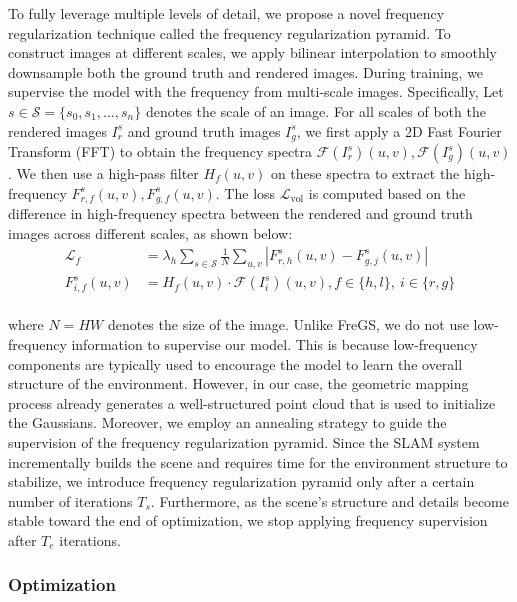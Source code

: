 To fully leverage multiple levels of detail, we propose a novel frequency regularization technique called the frequency regularization pyramid. To construct images at different scales, we apply bilinear interpolation to smoothly downsample both the ground truth and rendered images. During training, we supervise the model with the frequency from multi-scale images. Specifically, Let $s \in \mathcal{S} = \{s_0, s_1, \ldots, s_n\}$ denotes the scale of an image. For all scales of both the rendered images $I_r^{s}$ and ground truth images $I_g^{s}$, we first apply a 2D Fast Fourier Transform (FFT) to obtain the frequency spectra $\mathcal{F}(I_r^{s})(u, v), \mathcal{F}(I_g^{s})(u, v)$. We then use a high-pass filter $H_f(u, v)$ on these spectra to extract the high-frequency $F_{r, f}^{s}(u, v), F_{g, f}^{s}(u, v)$. The loss $\mathcal{L}_{\text{vol}}$ is computed based on the difference in high-frequency spectra between the rendered and ground truth images across different scales, as shown below:
\begin{align}
\mathcal{L}_{f} &=\lambda_h \sum_{s \in \mathcal{S}} \frac{1}{N} \sum_{u, v} \left| F_{r, h}^{s}(u, v) - F_{g, j}^{s}(u, v) \right|  \\
F_{i, f}^{s}(u, v) &= H_f(u, v) \cdot \mathcal{F}(I_i^{s})(u, v), f\in \{h, l\},\ i\in \{r, g\} \nonumber
\end{align} \\
where $N =HW$ denotes the size of the image. Unlike FreGS, we do not use low-frequency information to supervise our model. This is because low-frequency components are typically used to encourage the model to learn the overall structure of the environment. However, in our case, the geometric mapping process already generates a well-structured point cloud that is used to initialize the Gaussians. Moreover, we employ an annealing strategy to guide the supervision of the frequency regularization pyramid. Since the SLAM system incrementally builds the scene and requires time for the environment structure to stabilize, we introduce frequency regularization pyramid only after a certain number of iterations $T_s$. Furthermore, as the scene's structure and details become stable toward the end of optimization, we stop applying frequency supervision after $T_e$ iterations.

\subsubsection{Optimization}

